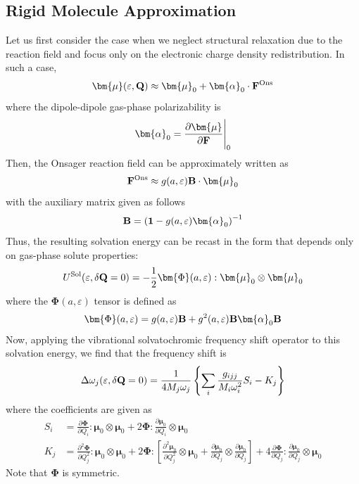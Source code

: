 \documentclass[b5paper,oneside,fleqn,11pt]{book}
\newcommand{\BM}[1]{\bm{#1}}
\newcommand{\fderiv}[2]{\ensuremath{
    \frac{\partial #1}{\partial #2}}}
\newcommand{\sderiv}[2]{\ensuremath{
    \frac{\partial^2 #1}{\partial #2^2}
    }}
\begin{document}
\begin{refsection}
\subsection{Rigid Molecule Approximation}

Let us first consider the case when we neglect structural
relaxation due to the reaction field and focus only
on the electronic charge density redistribution. In such a case,
%
\begin{equation}
 {\BM \mu}(\varepsilon, {\bf Q}) \approx 
 {\BM \mu}_0 + {\BM \alpha}_0  \cdot {\bf F}^{\rm Ons}
\end{equation}
%
where the dipole\hyp{}dipole gas\hyp{}phase polarizability is
%
\begin{equation}
{\BM \alpha}_0  = \fderiv{{\BM \mu}}{\bf F}\Bigg|_{0}
\end{equation}
%
Then, the Onsager reaction field can be approximately written as
%
\begin{equation}
{\bf F}^{\rm Ons} \approx g(a,\varepsilon) {\bf B} \cdot {\BM \mu}_0
\end{equation}
%
with the auxiliary matrix given as follows
%
\begin{equation}
{\bf B} = \left( {\bf 1} - g(a,\varepsilon){\BM \alpha}_0 \right)^{-1}
\end{equation}
%
Thus, the resulting solvation energy can be recast in the form
that depends only on gas\hyp{}phase solute properties:
%
\begin{equation} \label{e:ons-e-sol-init}
U^{\rm Sol}(\varepsilon, \delta{\bf Q}=0) = -\frac{1}{2} {\BM \Phi}(a, \varepsilon) : {\BM \mu}_0 \otimes {\BM \mu}_0
\end{equation}
%
where the ${\BM \Phi}(a, \varepsilon)$ tensor is defined as
%
\begin{equation}
{\BM \Phi}(a, \varepsilon) = g(a,\varepsilon) {\bf B} + g^2(a,\varepsilon) {\bf B} {\BM \alpha}_0 {\bf B}
\end{equation}
%
Now, applying the vibrational solvatochromic frequency shift
operator to this solvation energy,
we find that the frequency shift is
%
\begin{equation} \label{e:dw-ons-working-form}
\Delta\omega_j(\varepsilon, \delta{\bf Q}=0) = \frac{1}{4M_j\omega_j}
\left\{ \sum_i \frac{g_{ijj}}{M_i\omega_i^2}S_i - K_j \right\}
\end{equation}
%
where the coefficients are given as
%
\begin{subequations}
 \begin{align}
  S_i &= \fderiv{{\BM \Phi}}{Q_i} : {\BM \mu}_0 \otimes {\BM \mu}_0 
           + 2{\BM \Phi} : \fderiv{{\BM \mu}_0}{Q_i} \otimes {\BM \mu}_0 \label{e:ons-si-init}\\
  K_j &= \sderiv{{\BM \Phi}}{Q_j} : {\BM \mu}_0 \otimes {\BM \mu}_0
           + 2{\BM \Phi} : \left[ \sderiv{{\BM \mu}_0}{Q_j} \otimes {\BM \mu}_0 
           +  \fderiv{{\BM \mu}_0}{Q_j} \otimes \fderiv{{\BM \mu}_0}{Q_j} \right] 
           + 4\fderiv{{\BM \Phi}}{Q_j} : \fderiv{{\BM \mu}_0}{Q_j} \otimes {\BM \mu}_0  \label{e:ons-ki-init}
 \end{align}
\end{subequations}
%
Note that ${\BM \Phi}$ is symmetric.  


\end{refsection}
\end{document}
